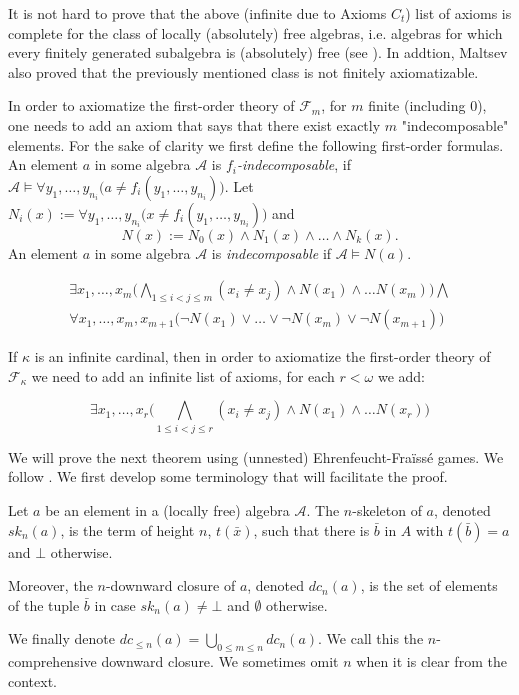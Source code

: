 \documentclass[a4paper,11pt]{article}
\begin{document}
It is not hard to prove that the above (infinite due to Axioms $C_t$) list of axioms is complete for the class of locally (absolutely) free algebras, i.e. algebras for which every finitely generated subalgebra is (absolutely) free (see \cite[Chapter 23: Theorem 1]{Malcev71}). In addtion, Maltsev also proved that the previously mentioned class is not finitely axiomatizable. 

In order to axiomatize the first-order theory of $\mathcal{F}_m$, for $m$ finite (including $0$), one needs to add an axiom that says that there exist exactly $m$ "indecomposable" elements. For the sake of clarity we first define the following first-order formulas. 
An element $a$ in some algebra $\mathcal{A}$ is {\em $f_i$-indecomposable}, if $\mathcal{A}\models\forall y_1,\ldots, y_{n_i}\big(a\neq f_i(y_1,\ldots,y_{n_i})\big)$. Let $N_i(x):=\forall y_1,\ldots, y_{n_i}\big(x\neq f_i(y_1,\ldots,y_{n_i})\big)$ and
\begin{equation}\label{eq.1 - def - N(x)}
    N(x):=N_0(x)\land N_1(x)\land\ldots\land N_k(x).
\end{equation}
\noindent
An element $a$ in some algebra $\mathcal{A}$ is  {\em indecomposable} if $\mathcal{A}\models N(a)$.

\begin{equation}
\tag{Axiom $D_m$}
\begin{split}
\exists x_1,\ldots, x_m \big(\bigwedge_{1\leq i<j\leq m} (x_i\neq x_j)  \land 
N(x_1)\land\ldots N(x_m)\big) \bigwedge \\
\forall x_1,\ldots, x_m, x_{m+1}\big(\lnot N(x_1)\lor \ldots \lor \lnot N(x_m)\lor \lnot N(x_{m+1})\big)
\end{split}
\end{equation}

If $\kappa$ is an infinite cardinal, then in order to axiomatize the first-order theory of $\mathcal{F}_\kappa$ we need to add an infinite list of axioms, for each $r<\omega$ we add:  

\begin{equation}
\tag{Axiom $E_r$}
\exists x_1,\ldots, x_r \big(\bigwedge_{1\leq i<j\leq r} (x_i\neq x_j)  \land 
N(x_1)\land\ldots N(x_r)\big)
\end{equation}

We will prove the next theorem using (unnested) Ehrenfeucht-Fra\"iss\'e games. We follow \cite[Section 3.3]{HodgesBook}. We first develop some terminology that will facilitate the proof. 

\begin{definition}
Let $a$ be an element in a (locally free) algebra $\mathcal{A}$. The $n$-skeleton of $a$, denoted $sk_n(a)$, is the term of height $n$, $t(\bar x)$, such that there is $\bar b$ in $A$ with $t(\bar b)=a$ and $\bot$ otherwise. 

Moreover, the $n$-downward closure of $a$, denoted $dc_n(a)$, is the set of elements of the tuple $\bar b$ in case $sk_n(a)\neq\bot$ and $\emptyset$ otherwise. 

We finally denote $dc_{\leq n}(a)=\bigcup_{0\leq m\leq n} dc_n(a)$. We call this the $n$-comprehensive downward closure. We sometimes omit $n$ when it is clear from the context. 
\end{definition}
\end{document}
